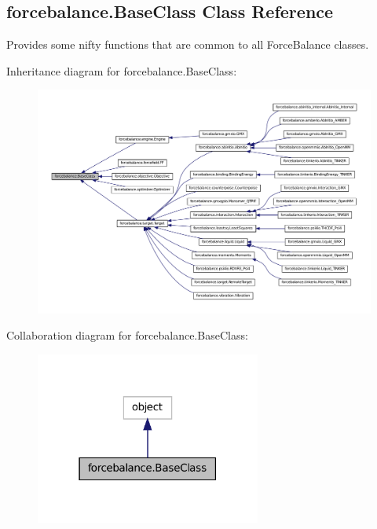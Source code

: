 \hypertarget{classforcebalance_1_1BaseClass}{\subsection{forcebalance.\-Base\-Class Class Reference}
\label{classforcebalance_1_1BaseClass}
}


Provides some nifty functions that are common to all Force\-Balance classes.  




Inheritance diagram for forcebalance.\-Base\-Class\-:
\nopagebreak
\begin{figure}[H]
\begin{center}
\leavevmode
\includegraphics[width=350pt]{classforcebalance_1_1BaseClass__inherit__graph}
\end{center}
\end{figure}


Collaboration diagram for forcebalance.\-Base\-Class\-:\nopagebreak
\begin{figure}[H]
\begin{center}
\leavevmode
\includegraphics[width=210pt]{classforcebalance_1_1BaseClass__coll__graph}
\end{center}
\end{figure}
